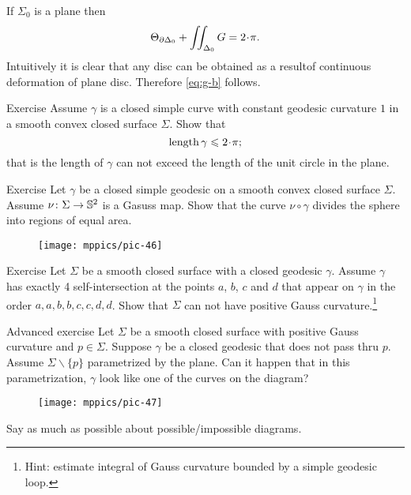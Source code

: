 If $\Sigma_0$ is a plane then 
\[\tgc{\partial\Delta_0}+\iint_{\Delta_0} G=2\cdot \pi.\]
Intuitively it is clear that any disc can be obtained as a resultof continuous deformation of plane disc.
Therefore \ref{eq:g-b} follows.
\qeds





\begin{thm}{Exercise}
 Assume $\gamma$ is a closed simple curve with constant geodesic curvature $1$ in a smooth convex closed surface $\Sigma$.
 Show that 
 \[\length\gamma\le 2\cdot\pi;\]
that is the length of $\gamma$ can not exceed the length of the unit circle in the plane.  
\end{thm}


\begin{thm}{Exercise}
Let $\gamma$ be a closed simple geodesic on a smooth convex closed surface $\Sigma$.
Assume $\nu\colon\Sigma\to\mathbb{S}^2$ is a Gasuss map.
Show that the curve $\nu\circ\gamma$ divides the sphere into regions of equal area.
\end{thm}


\begin{wrapfigure}{o}{32 mm}
\vskip-0mm
\centering
\texttt{[image: mppics/pic-46]}
\vskip-0mm
\end{wrapfigure}

\begin{thm}{Exercise}
Let $\Sigma$ be a smooth closed surface with a closed geodesic $\gamma$.
Assume $\gamma$ has exactly 4 self-intersection at the points $a$, $b$, $c$ and $d$ that appear on $\gamma$ in the order $a,a,b,b,c,c,d,d$.
Show that $\Sigma$ can not have positive Gauss curvature.\footnote{Hint: estimate integral of Gauss curvature bounded by a simple geodesic loop.}
\end{thm}

\begin{thm}{Advanced exercise}
Let $\Sigma$ be a smooth closed surface with positive Gauss curvature and $p\in\Sigma$. 
Suppose $\gamma$ be a closed geodesic that does not pass thru $p$.
Assume $\Sigma\backslash\{p\}$ parametrized by the plane.
Can it happen that in this parametrization,  $\gamma$ look like one of the curves on the diagram?
\begin{figure}[h!]
\vskip-0mm
\centering
\texttt{[image: mppics/pic-47]}
\vskip-0mm
\end{figure}
Say as much as possible about possible/impossible diagrams.
\end{thm}


